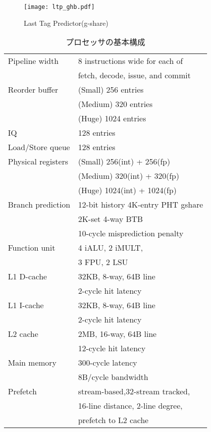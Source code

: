 \documentclass[twocolumn]{jsarticle}
\begin{document}
  \begin{figure}[ht]
    \centering
    \texttt{[image: ltp\_ghb.pdf]}
    \caption{Last Tag Predictor(g-share)}
    \label{fig:ltp_gshare}
  \end{figure}

  \begin{table}[htb]
    \caption{プロセッサの基本構成}
    \footnotesize
    \center
      \begin{tabular}{l|l} \hline \hline
       Pipeline width & 8 instructions wide for each of \\
       & fetch, decode, issue, and commit \\
       Reorder buffer & (Small) 256 entries \\
       & (Medium) 320 entries \\
       & (Huge) 1024 entries \\
       IQ & 128 entries \\
       Load/Store queue & 128 entries \\
       Physical registers & (Small) 256(int) + 256(fp) \\
       & (Medium) 320(int) + 320(fp) \\
       & (Huge) 1024(int) + 1024(fp) \\
       Branch prediction & 12-bit history 4K-entry PHT gshare \\
       & 2K-set 4-way BTB \\
       & 10-cycle misprediction penalty \\
       Function unit & 4 iALU, 2 iMULT, \\
       &  3 FPU, 2 LSU \\
       L1 D-cache & 32KB, 8-way, 64B line \\
        & 2-cycle hit latency \\
       L1 I-cache & 32KB, 8-way, 64B line \\
        &  2-cycle hit latency \\
       L2 cache & 2MB, 16-way, 64B line \\
        & 12-cycle hit latency \\  
       Main memory & 300-cycle latency \\
       & 8B/cycle bandwidth \\ 
       Prefetch & stream-based,32-stream tracked,  \\ 
       & 16-line distance, 2-line degree, \\
       & prefetch to L2 cache \\ \hline
    \end{tabular}
    \label{tab:base_config}
  \end{table}
\end{document}
